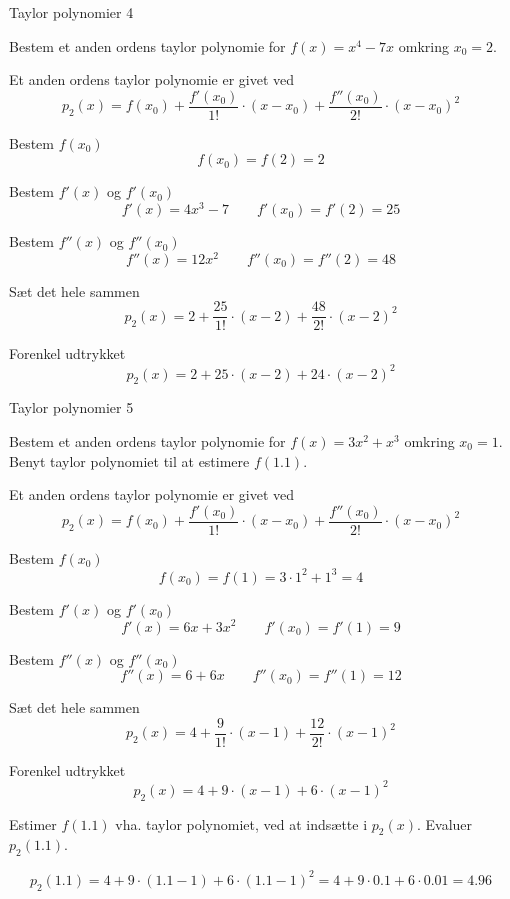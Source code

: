 \documentclass{article}
\begin{document}
\begin{exercise}{Taylor polynomier 4}

Bestem et anden ordens taylor polynomie for $f(x) = x^4 - 7x$
omkring $x_0 = 2$.


\hint
Et anden ordens taylor polynomie
er givet ved
\[
p_2(x) = f(x_0) + \frac{f'(x_0)}{1!} \cdot (x - x_0)
 + \frac{f''(x_0)}{2!} \cdot (x - x_0)^2
\]


\hint
Bestem $f(x_0)$
\[
f(x_0) = f(2) = 2
\]

\hint
Bestem $f'(x)$ og $f'(x_0)$
\[
f'(x) = 4x^3 - 7 \qquad f'(x_0) = f'(2) = 25
\]

\hint
Bestem $f''(x)$ og $f''(x_0)$
\[
f''(x) = 12 x^2 \qquad f''(x_0) = f''(2) = 48
\]

\hint
Sæt det hele sammen
\[
p_2(x) = 2 + \frac{25}{1!} \cdot \left(x - 2\right) + \frac{48}{2!} \cdot \left(x - 2\right)^2
\]

\hint
Forenkel udtrykket
\[
p_2(x) = 2 + 25 \cdot \left(x - 2\right) + 24 \cdot \left(x - 2\right)^2
\]


\end{exercise}

\begin{exercise}{Taylor polynomier 5}

Bestem et anden ordens taylor polynomie for $f(x) = 3 x^2 + x^3$
omkring $x_0 = 1$.
Benyt taylor polynomiet til at estimere $f(1.1)$.


\hint
Et anden ordens taylor polynomie
er givet ved
\[
p_2(x) = f(x_0) + \frac{f'(x_0)}{1!} \cdot (x - x_0)
 + \frac{f''(x_0)}{2!} \cdot (x - x_0)^2
\]


\hint
Bestem $f(x_0)$
\[
f(x_0) = f(1) = 3 \cdot 1^2 + 1^3 = 4
\]

\hint
Bestem $f'(x)$ og $f'(x_0)$
\[
f'(x) = 6 x + 3 x^2 \qquad f'(x_0) = f'(1) = 9
\]

\hint
Bestem $f''(x)$ og $f''(x_0)$
\[
f''(x) = 6 + 6x \qquad f''(x_0) = f''(1) = 12
\]

\hint
Sæt det hele sammen
\[
p_2(x) = 4 + \frac{9}{1!} \cdot \left(x - 1\right) + \frac{12}{2!} \cdot \left(x - 1\right)^2
\]

\hint
Forenkel udtrykket
\[
p_2(x) = 4 + 9 \cdot \left(x - 1\right) + 6 \cdot \left(x - 1\right)^2
\]

\hint
Estimer $f(1.1)$ vha. taylor polynomiet, ved at indsætte i $p_2(x)$.
Evaluer $p_2(1.1)$.

\hint
\[
p_2(1.1) = 4 + 9 \cdot \left(1.1 - 1\right) + 6 \cdot \left(1.1 - 1\right)^2
 = 4 + 9 \cdot 0.1 + 6 \cdot 0.01 = 4.96
\]

\end{exercise}
\end{document}

